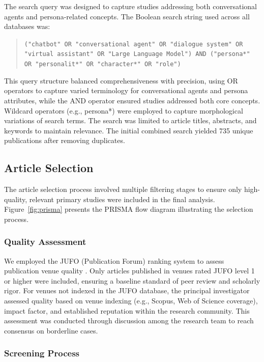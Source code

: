 \documentclass{article}
\begin{document}
The search query was designed to capture studies addressing both conversational agents and persona-related concepts. The Boolean search string used across all databases was:

\begin{quote}
\texttt{("chatbot" OR "conversational agent" OR "dialogue system" OR "virtual assistant" OR "Large Language Model") AND ("persona*" OR "personalit*" OR "character*" OR "role")}
\end{quote}

This query structure balanced comprehensiveness with precision, using OR operators to capture varied terminology for conversational agents and persona attributes, while the AND operator ensured studies addressed both core concepts. Wildcard operators (e.g., persona*) were employed to capture morphological variations of search terms. The search was limited to article titles, abstracts, and keywords to maintain relevance. The initial combined search yielded 735 unique publications after removing duplicates.

\subsection{Article Selection}

The article selection process involved multiple filtering stages to ensure only high-quality, relevant primary studies were included in the final analysis. Figure~\ref{fig:prisma} presents the PRISMA flow diagram illustrating the selection process.

\subsubsection{Quality Assessment}

We employed the JUFO (Publication Forum) ranking system to assess publication venue quality \citep{jufo2021classification}. Only articles published in venues rated JUFO level 1 or higher were included, ensuring a baseline standard of peer review and scholarly rigor. For venues not indexed in the JUFO database, the principal investigator assessed quality based on venue indexing (e.g., Scopus, Web of Science coverage), impact factor, and established reputation within the research community. This assessment was conducted through discussion among the research team to reach consensus on borderline cases.

\subsubsection{Screening Process}
\end{document}
